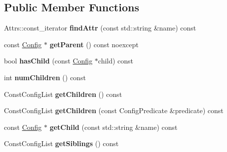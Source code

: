 \subsection*{Public Member Functions}
\begin{DoxyCompactItemize}
\item 
\mbox{\label{classtheoria_1_1config_1_1Config_a633738ea60f5d4d0d244bc7d05c9d17f}} 
Attrs\+::const\+\_\+iterator {\bfseries find\+Attr} (const std\+::string \&name) const
\item 
\mbox{\label{classtheoria_1_1config_1_1Config_ac30090b5eedf4126046d7ace48b5fa40}} 
const \hyperlink{classtheoria_1_1config_1_1Config}{Config} $\ast$ {\bfseries get\+Parent} () const noexcept
\item 
\mbox{\label{classtheoria_1_1config_1_1Config_ad9a5e883dc4918b1b9d00c1a53979149}} 
bool {\bfseries has\+Child} (const \hyperlink{classtheoria_1_1config_1_1Config}{Config} $\ast$child) const
\item 
\mbox{\label{classtheoria_1_1config_1_1Config_ad67efbe126c02048be83ebb40f7d7bce}} 
int {\bfseries num\+Children} () const
\item 
\mbox{\label{classtheoria_1_1config_1_1Config_ab258c41faac01f6dda0ff0c86adc9903}} 
Const\+Config\+List {\bfseries get\+Children} () const
\item 
\mbox{\label{classtheoria_1_1config_1_1Config_a6433b53d322bd5bc78f67c8a8d9f2700}} 
Const\+Config\+List {\bfseries get\+Children} (const Config\+Predicate \&predicate) const
\item 
\mbox{\label{classtheoria_1_1config_1_1Config_af8e4621be24f1860b1fed707628db7e9}} 
const \hyperlink{classtheoria_1_1config_1_1Config}{Config} $\ast$ {\bfseries get\+Child} (const std\+::string \&name) const
\item 
\mbox{\label{classtheoria_1_1config_1_1Config_afe6803a6e3e6600ab4ce33a7417ffaa9}} 
Const\+Config\+List {\bfseries get\+Siblings} () const

\end{DoxyCompactItemize}
